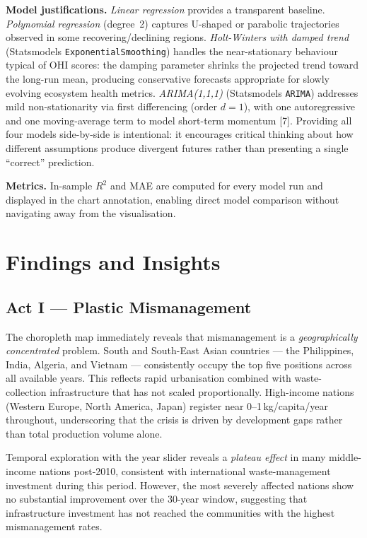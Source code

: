 \documentclass[10pt,twocolumn]{article}
\newcommand{\tool}[1]{\texttt{#1}}
\begin{document}
\textbf{Model justifications.}
\emph{Linear regression} provides a transparent baseline.
\emph{Polynomial regression} (degree~2) captures U-shaped or parabolic
trajectories observed in some recovering/declining regions.
\emph{Holt-Winters with damped trend} (Statsmodels
\tool{ExponentialSmoothing}) handles the near-stationary behaviour typical
of OHI scores: the damping parameter shrinks the projected trend toward the
long-run mean, producing conservative forecasts appropriate for slowly
evolving ecosystem health metrics.
\emph{ARIMA(1,1,1)} (Statsmodels \tool{ARIMA}) addresses mild
non-stationarity via first differencing (order $d = 1$), with one
autoregressive and one moving-average term to model short-term momentum [7].
Providing all four models side-by-side is intentional: it encourages
critical thinking about how different assumptions produce divergent futures
rather than presenting a single ``correct'' prediction.

\textbf{Metrics.}
In-sample $R^2$ and MAE are computed for every model run and displayed in
the chart annotation, enabling direct model comparison without navigating
away from the visualisation.

\section{Findings and Insights}

\subsection{Act I --- Plastic Mismanagement}

The choropleth map immediately reveals that mismanagement is a
\emph{geographically concentrated} problem.
South and South-East Asian countries --- the Philippines, India, Algeria,
and Vietnam --- consistently occupy the top five positions across all
available years.
This reflects rapid urbanisation combined with waste-collection
infrastructure that has not scaled proportionally.
High-income nations (Western Europe, North America, Japan) register near
0--1\,kg/capita/year throughout, underscoring that the crisis is driven
by development gaps rather than total production volume alone.

Temporal exploration with the year slider reveals a \emph{plateau effect}
in many middle-income nations post-2010, consistent with international
waste-management investment during this period.
However, the most severely affected nations show no substantial improvement
over the 30-year window, suggesting that infrastructure investment has not
reached the communities with the highest mismanagement rates.
\end{document}
